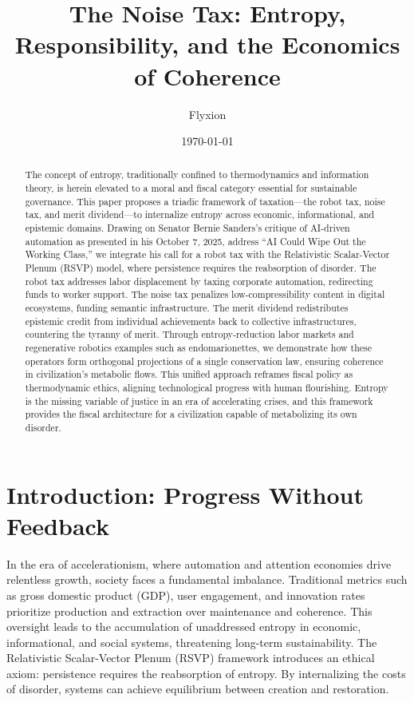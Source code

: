 \documentclass[12pt]{article}
\title{The Noise Tax: Entropy, Responsibility, and the Economics of Coherence}
\author{Flyxion}
\date{\today}
\begin{document}
\maketitle

\begin{abstract}
The concept of entropy, traditionally confined to thermodynamics and information theory, is herein elevated to a moral and fiscal category essential for sustainable governance. This paper proposes a triadic framework of taxation—the robot tax, noise tax, and merit dividend—to internalize entropy across economic, informational, and epistemic domains. Drawing on Senator Bernie Sanders's critique of AI-driven automation as presented in his October 7, 2025, address ``AI Could Wipe Out the Working Class,'' we integrate his call for a robot tax with the Relativistic Scalar-Vector Plenum (RSVP) model, where persistence requires the reabsorption of disorder. The robot tax addresses labor displacement by taxing corporate automation, redirecting funds to worker support. The noise tax penalizes low-compressibility content in digital ecosystems, funding semantic infrastructure. The merit dividend redistributes epistemic credit from individual achievements back to collective infrastructures, countering the tyranny of merit. Through entropy-reduction labor markets and regenerative robotics examples such as endomarionettes, we demonstrate how these operators form orthogonal projections of a single conservation law, ensuring coherence in civilization's metabolic flows. This unified approach reframes fiscal policy as thermodynamic ethics, aligning technological progress with human flourishing. Entropy is the missing variable of justice in an era of accelerating crises, and this framework provides the fiscal architecture for a civilization capable of metabolizing its own disorder.
\end{abstract}

\section{Introduction: Progress Without Feedback}
In the era of accelerationism, where automation and attention economies drive relentless growth, society faces a fundamental imbalance. Traditional metrics such as gross domestic product (GDP), user engagement, and innovation rates prioritize production and extraction over maintenance and coherence. This oversight leads to the accumulation of unaddressed entropy in economic, informational, and social systems, threatening long-term sustainability. The Relativistic Scalar-Vector Plenum (RSVP) framework introduces an ethical axiom: persistence requires the reabsorption of entropy. By internalizing the costs of disorder, systems can achieve equilibrium between creation and restoration.
\end{document}
